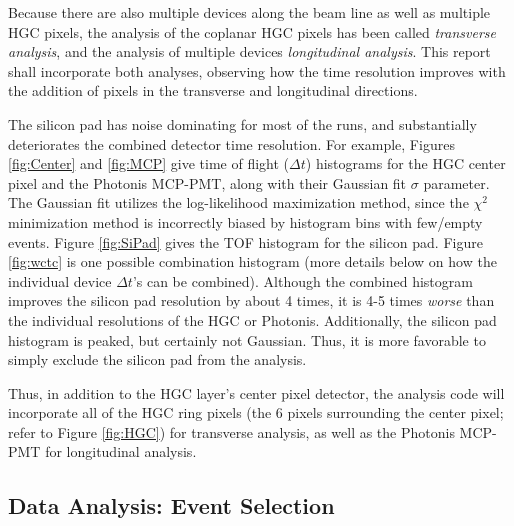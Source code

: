 \documentclass[twocolumn,aps,prd,reprint,superscriptaddress,floatfix]{revtex4-1}
\begin{document}
Because there are also multiple devices along the beam line as well as multiple HGC pixels, the analysis of the coplanar HGC pixels has been called \textit{transverse analysis}, and the analysis of multiple devices \textit{longitudinal analysis}. 
This report shall incorporate both analyses, observing how the time resolution improves with the addition of pixels in the transverse and longitudinal directions.

The silicon pad has noise dominating for most of the runs, and substantially deteriorates the combined detector time resolution. 
For example, Figures \ref{fig:Center} and \ref{fig:MCP} give time of flight ($\Delta t$) histograms for the HGC center pixel and the Photonis MCP-PMT, along with their Gaussian fit $\sigma$ parameter. 
The Gaussian fit utilizes the log-likelihood maximization method, since the $\chi^2$ minimization method is incorrectly biased by histogram bins with few/empty events.
Figure \ref{fig:SiPad} gives the TOF histogram for the silicon pad. 
Figure \ref{fig:wctc} is one possible combination histogram (more details below on how the individual device $\Delta t$'s can be combined). 
Although the combined histogram improves the silicon pad resolution by about 4 times, it is 4-5 times \textit{worse} than the individual resolutions of the HGC or Photonis. 
Additionally, the silicon pad histogram is peaked, but certainly not Gaussian. 
Thus, it is more favorable to simply exclude the silicon pad from the analysis.

Thus, in addition to the HGC layer's center pixel detector, the analysis code will incorporate all of the HGC ring pixels (the 6 pixels surrounding the center pixel; refer to Figure \ref{fig:HGC}) for transverse analysis, as well as the Photonis MCP-PMT for longitudinal analysis.


\subsection{Data Analysis: Event Selection}
\end{document}
